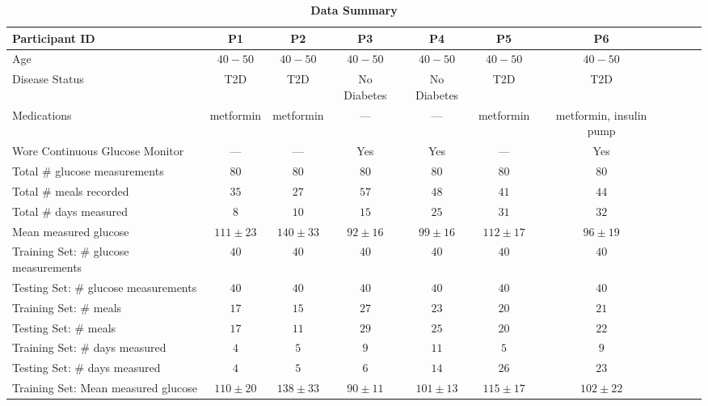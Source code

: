 \documentclass[10pt,letterpaper]{article}
\begin{document}
\begin{table}[!ht]
\begin{adjustwidth}{-2.25in}{0in} %
\centering
\caption{{\bf Data Summary}}
\label{table:participants}
\scriptsize
\begin{tabular}{|l|c|c|c|c|c|c|c|c|c|}
\hline
Participant ID & P1 & P2 & P3 & P4 & P5 & P6 \\ \hline %
Age & $40-50$ & $40-50$ & $40-50$ & $40-50$ & $40-50$ & $40-50$ \\ \hline
Disease Status & T2D & T2D & No Diabetes & No Diabetes & T2D & T2D \\ \hline
Medications & metformin & metformin & --- & --- & metformin & metformin, insulin pump \\ \hline
Wore Continuous Glucose Monitor & --- & --- & Yes & Yes & --- & Yes \\ \hline
Total $\#$ glucose measurements &  $80$ &  $80$ & $80$ & $80$ & $80$ & $80$ \\ \hline
Total $\#$ meals recorded &  $35$ &  $27$ & $57$ & $48$ & $41$ & $44$ \\ \hline
Total $\#$ days measured & $8$ & $10$ & $15$ & $25$ & $31$ & $32$ \\ \hline
Mean measured glucose & $111 \pm 23$  & $140 \pm 33$  & $92 \pm 16$  & $99 \pm 16$ & $112 \pm 17$  & $96 \pm 19$ \\ \hline
Training Set: $\#$ glucose measurements &  $40$ &  $40$ & $40$ & $40$ & $40$ & $40$ \\ \hline
Testing Set: $\#$ glucose measurements &  $40$ &  $40$ & $40$ & $40$ & $40$ & $40$ \\ \hline
Training Set: $\#$ meals &  $17$ &  $15$ & $27$ & $23$ & $20$ & $21$ \\ \hline
Testing Set: $\#$ meals &  $17$ &  $11$ & $29$ & $25$ & $20$ & $22$ \\ \hline
Training Set: $\#$ days measured & $4$ & $5$ & $9$ & $11$ & $5$ & $9$ \\ \hline
Testing Set: $\#$ days measured & $4$ & $5$ & $6$ & $14$ & $26$ & $23$ \\ \hline
Training Set: Mean measured glucose & $110 \pm 20$  & $138 \pm 33$  & $90 \pm 11$  & $101 \pm 13$ & $115 \pm 17$  & $102 \pm 22$ \\ \hline

\end{tabular}
\end{adjustwidth}
\end{table}
\end{document}
